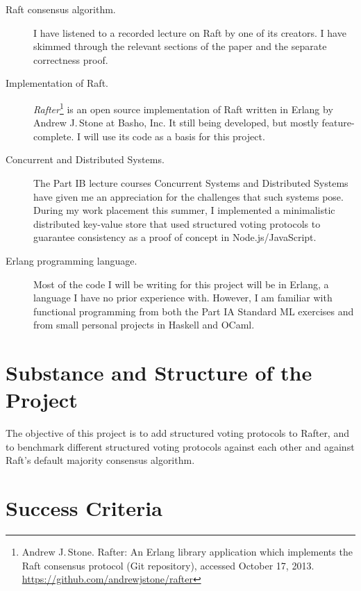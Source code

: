 \documentclass[12pt]{scrartcl}
\begin{document}
\begin{description}

\item[Raft consensus algorithm.] I have listened to a recorded lecture on Raft by one of its creators. I have skimmed through the relevant sections of the paper and the separate correctness proof.

\item[Implementation of Raft.] \emph{Rafter}\footnote{Andrew J.\,Stone. Rafter: An Erlang library application which implements the Raft consensus protocol (Git repository), accessed October 17, 2013. \url{https://github.com/andrewjstone/rafter}} is an open source implementation of Raft written in Erlang by Andrew J.\,Stone at Basho, Inc. It still being developed, but mostly feature-complete. I will use its code as a basis for this project.

\item[Concurrent and Distributed Systems.] The Part IB lecture courses Concurrent Systems and Distributed Systems have given me an appreciation for the challenges that such systems pose. During my work placement this summer, I implemented a minimalistic distributed key-value store that used structured voting protocols to guarantee consistency as a proof of concept in Node.js/JavaScript.

\item[Erlang programming language.] Most of the code I will be writing for this project will be in Erlang, a language I have no prior experience with. However, I am familiar with functional programming from both the Part IA Standard ML exercises and from small personal projects in Haskell and OCaml.

\end{description}


\section{Substance and Structure of the Project%
  \label{substance-and-structure-of-the-project}%
}

The objective of this project is to add structured voting protocols to Rafter, and to benchmark different structured voting protocols against each other and against Raft's default majority consensus algorithm.

\section{Success Criteria%
  \label{success-criteria}%
}
\end{document}
